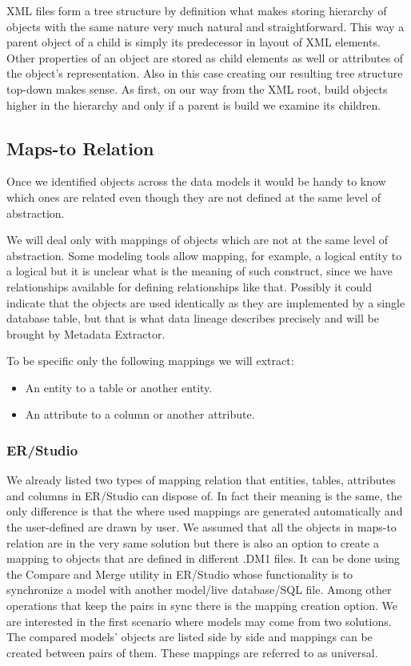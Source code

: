 XML files form a tree structure by definition what makes storing hierarchy of objects with the same nature very much natural and straightforward. 
This way a parent object of a child is simply its predecessor in layout of XML elements. 
Other properties of an object are stored as child elements as well or attributes of the object's representation. 
Also in this case creating our resulting tree structure top-down makes sense. As first, on our way from the XML root, build objects higher in the hierarchy and only if a parent is build we examine its children.


\subsection{Maps-to Relation}
\label{maps_to_analysis}

Once we identified objects across the data models it would be handy  to know which ones are related even though they are not defined at the same level of abstraction.

We will deal only with mappings of objects which are not at the same level of abstraction. 
Some modeling tools allow mapping, for example, a logical entity to a logical but it is unclear what is the meaning of such construct, since we have relationships available for defining relationships like that. Possibly it could indicate that the objects are used identically as they are implemented by a single database table, but that is what data lineage describes precisely and will be brought by Metadata Extractor.

To be specific only the following mappings we will extract: 
\begin{itemize}
	\item An entity to a table or another entity. 
	\item An attribute to a column or another attribute.
\end{itemize}

\subsubsection{ER/Studio}

We already listed two types of mapping relation that entities, tables, attributes and columns in ER/Studio can dispose of. 
In fact their meaning is the same, the only difference is that the where used mappings are generated automatically and the user-defined are drawn by user. We assumed that all the objects in maps-to relation are in the very same solution but there is also an option to create a mapping to objects that are defined in different .DM1 files. It can be done using the Compare and Merge utility in ER/Studio whose functionality is to synchronize a model with another model/live database/SQL file. Among other operations that keep the pairs in sync there is the mapping creation option. We are interested in the first scenario where models may come from two solutions. The compared models' objects are listed side by side and mappings can be created between pairs of them. These mappings are referred to as universal. \\

